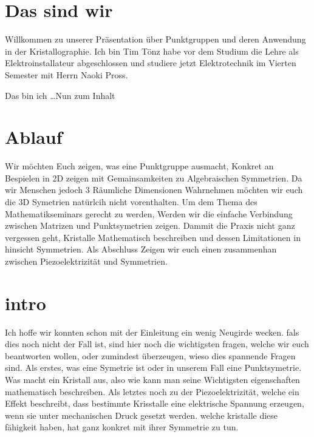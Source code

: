 \documentclass[a4paper]{article}
\newcommand{\scene}[1]{\par\noindent[ #1 ]\par}
\begin{document}
\section{Das sind wir}
\scene{Tim}
Willkommen zu unserer Präsentation über Punktgruppen und deren Anwendung in der
Kristallographie.  Ich bin Tim Tönz habe vor dem Studium die Lehre als
Elektroinstallateur abgeschlossen und studiere jetzt Elektrotechnik im Vierten
Semester mit Herrn Naoki Pross. 
\scene{Naoki}
  Das bin ich  \ldots  Nun zum Inhalt 

\section{Ablauf}
Wir möchten Euch zeigen, was eine Punktgruppe ausmacht, Konkret an Bespielen in 2D zeigen mit Gemainsamkeiten zu Algebraischen Symmetrien. 
Da wir Menschen jedoch 3 Räumliche Dimensionen Wahrnehmen möchten wir euch die 3D Symetrien natürlcih nicht vorenthalten.
Um dem Thema des Mathematikseminars gerecht zu werden, Werden wir die einfache Verbindung zwischen Matrizen und Punktsymetrien zeigen.
Dammit die Praxis nicht ganz vergessen geht, Kristalle Mathematisch beschreiben und dessen Limitationen in hinsicht Symmetrien. 
Als Abschluss Zeigen wir euch einen zusammenhan zwischen Piezoelektrizität und Symmetrien.

\section{intro}
Ich hoffe wir konnten schon mit der Einleitung ein wenig Neugirde wecken.
fals dies noch nicht der Fall ist, sind hier noch die wichtigsten fragen, welche wir euch beantworten wollen, oder zumindest überzeugen, wieso dies spannende Fragen sind.  
Als erstes, was eine Symetrie ist oder in unserem Fall eine Punktsymetrie.
Was macht ein Kristall aus, also wie kann man seine Wichtigsten eigenschaften mathematisch beschreiben.
Als letztes noch zu der Piezoelektrizität, welche ein Effekt beschreibt, dass bestimmte Krisstalle eine elektrische Spannung erzeugen, wenn sie unter mechanischen Druck gesetzt werden. 
welche kristalle diese fähigkeit haben, hat ganz konkret mit ihrer Symmetrie zu tun.
\end{document}

